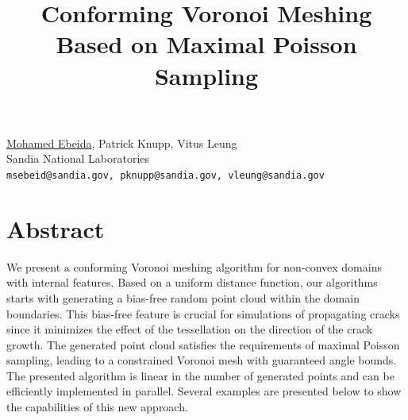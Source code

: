\title{Conforming Voronoi Meshing Based on Maximal Poisson Sampling}
\author{} \institute{}
\maketitle

\begin{center}
{\large \underline{Mohamed Ebeida}, Patrick Knupp, Vitus Leung}\\
Sandia National Laboratories\\
{\tt msebeid@sandia.gov, pknupp@sandia.gov, vleung@sandia.gov}
\end{center}

\section*{Abstract}
We present a conforming Voronoi meshing algorithm for non-convex domains with internal features. Based on a uniform distance function, our algorithms starts with generating a bias-free random point cloud within the domain boundaries. This bias-free feature is crucial for simulations of propagating cracks since it minimizes the effect of the tessellation on the direction of the crack growth. The generated point cloud satisfies the requirements of maximal Poisson sampling, leading to a constrained Voronoi mesh with guaranteed angle bounds. The presented algorithm is linear in the number of generated points and can be efficiently implemented in parallel. Several examples are presented below to show the capabilities of this new approach.

